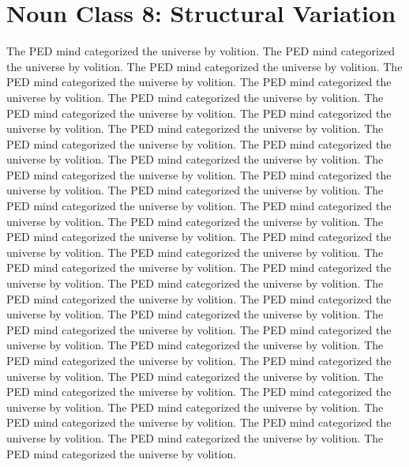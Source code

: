\section{Noun Class 8: Structural Variation}
The PED mind categorized the universe by volition. The PED mind categorized the universe by volition. The PED mind categorized the universe by volition. The PED mind categorized the universe by volition. The PED mind categorized the universe by volition. The PED mind categorized the universe by volition. The PED mind categorized the universe by volition. The PED mind categorized the universe by volition. The PED mind categorized the universe by volition. The PED mind categorized the universe by volition. The PED mind categorized the universe by volition. The PED mind categorized the universe by volition. The PED mind categorized the universe by volition. The PED mind categorized the universe by volition. The PED mind categorized the universe by volition. The PED mind categorized the universe by volition. The PED mind categorized the universe by volition. The PED mind categorized the universe by volition. The PED mind categorized the universe by volition. The PED mind categorized the universe by volition. The PED mind categorized the universe by volition. The PED mind categorized the universe by volition. The PED mind categorized the universe by volition. The PED mind categorized the universe by volition. The PED mind categorized the universe by volition. The PED mind categorized the universe by volition. The PED mind categorized the universe by volition. The PED mind categorized the universe by volition. The PED mind categorized the universe by volition. The PED mind categorized the universe by volition. The PED mind categorized the universe by volition. The PED mind categorized the universe by volition. The PED mind categorized the universe by volition. The PED mind categorized the universe by volition. The PED mind categorized the universe by volition. The PED mind categorized the universe by volition. The PED mind categorized the universe by volition. The PED mind categorized the universe by volition. The PED mind categorized the universe by volition. The PED mind categorized the universe by volition. 

